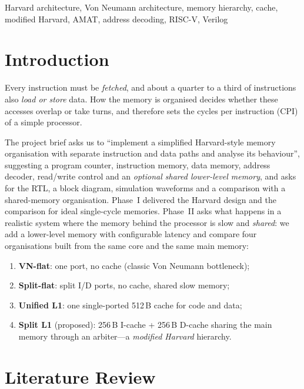 \documentclass[conference]{IEEEtran}
\begin{document}
\begin{IEEEkeywords}
Harvard architecture, Von Neumann architecture, memory hierarchy, cache,
modified Harvard, AMAT, address decoding, RISC-V, Verilog
\end{IEEEkeywords}

\section{Introduction}
Every instruction must be \emph{fetched}, and about a quarter to a third of
instructions also \emph{load or store} data. How the memory is organised
decides whether these accesses overlap or take turns, and therefore sets the
cycles per instruction (CPI) of a simple processor.

The project brief \cite{mca_projects} asks us to ``implement a simplified
Harvard-style memory organisation with separate instruction and data paths and
analyse its behaviour'', suggesting a program counter, instruction memory, data
memory, address decoder, read/write control and an \emph{optional shared
lower-level memory}, and asks for the RTL, a block diagram, simulation
waveforms and a comparison with a shared-memory organisation. Phase~I
delivered the Harvard design and the comparison for ideal single-cycle
memories. Phase~II asks what happens in a realistic system where the memory
behind the processor is slow and \emph{shared}: we add a lower-level memory
with configurable latency and compare four organisations built from the same
core and the same main memory:
\begin{enumerate}
\item \textbf{VN-flat}: one port, no cache (classic Von Neumann bottleneck);
\item \textbf{Split-flat}: split I/D ports, no cache, shared slow memory;
\item \textbf{Unified L1}: one single-ported 512\,B cache for code and data;
\item \textbf{Split L1} (proposed): 256\,B I-cache + 256\,B D-cache sharing
the main memory through an arbiter---a \emph{modified Harvard} hierarchy.
\end{enumerate}

\section{Literature Review}
\end{document}
